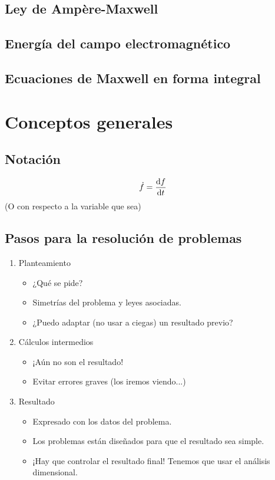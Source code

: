 \documentclass[a4paper]{book}
\begin{document}
\section{Ley de Ampère-Maxwell}

\section{Energía del campo electromagnético}

\section{Ecuaciones de Maxwell en forma integral}



\appendix

\chapter{Conceptos generales}


\section{Notación}
\[\dot f = \dv{f}{t}\]
(O con respecto a la variable que sea)

\section{Pasos para la resolución de problemas}

\begin{enumerate}
	\item Planteamiento \begin{itemize}
		      \item ¿Qué se pide?
		      \item Simetrías del problema y leyes asociadas.
		      \item ¿Puedo adaptar (no usar a ciegas) un resultado previo?
	      \end{itemize}
	\item Cálculos intermedios \begin{itemize}
		      \item ¡Aún no son el resultado!
		      \item Evitar errores graves (los iremos viendo...) \errorGrave
	      \end{itemize}
	\item Resultado \begin{itemize}
		      \item Expresado con los datos del problema.
		      \item Los problemas están diseñados para que el resultado sea simple.
		      \item ¡Hay que controlar el resultado final! Tenemos que usar el análisis dimensional.
	      \end{itemize}
\end{enumerate}
\end{document}
